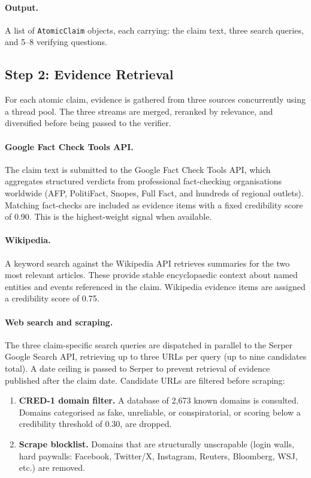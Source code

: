 \paragraph{Output.}
A list of \texttt{AtomicClaim} objects, each carrying: the claim text, three search queries, and 5--8 verifying questions.

\subsection{Step 2: Evidence Retrieval}

For each atomic claim, evidence is gathered from three sources concurrently using a thread pool. The three streams are merged, reranked by relevance, and diversified before being passed to the verifier.

\paragraph{Google Fact Check Tools API.}
The claim text is submitted to the Google Fact Check Tools API, which aggregates structured verdicts from professional fact-checking organisations worldwide (AFP, PolitiFact, Snopes, Full Fact, and hundreds of regional outlets). Matching fact-checks are included as evidence items with a fixed credibility score of 0.90. This is the highest-weight signal when available.

\paragraph{Wikipedia.}
A keyword search against the Wikipedia API retrieves summaries for the two most relevant articles. These provide stable encyclopaedic context about named entities and events referenced in the claim. Wikipedia evidence items are assigned a credibility score of 0.75.

\paragraph{Web search and scraping.}
The three claim-specific search queries are dispatched in parallel to the Serper Google Search API, retrieving up to three URLs per query (up to nine candidates total). A date ceiling is passed to Serper to prevent retrieval of evidence published after the claim date. Candidate URLs are filtered before scraping:

\begin{enumerate}
  \item \textbf{CRED-1 domain filter.} A database of 2{,}673 known domains is consulted. Domains categorised as fake, unreliable, or conspiratorial, or scoring below a credibility threshold of 0.30, are dropped.
  \item \textbf{Scrape blocklist.} Domains that are structurally unscrapable (login walls, hard paywalls: Facebook, Twitter/X, Instagram, Reuters, Bloomberg, WSJ, etc.) are removed.
\end{enumerate}

